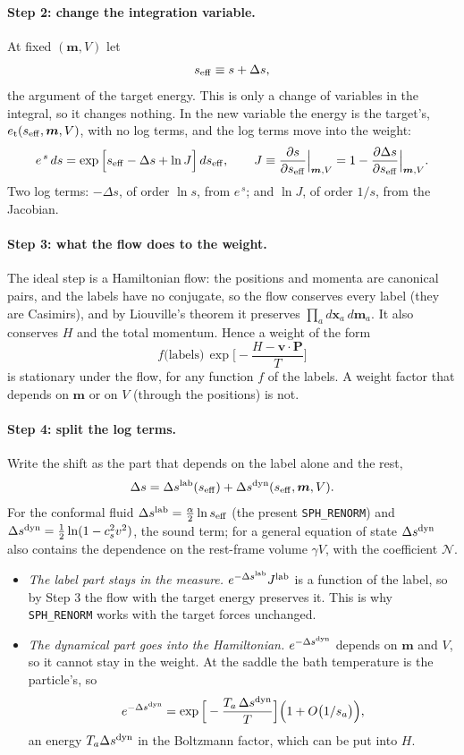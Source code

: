 \documentclass[11pt,aps,preprint,nofootinbib,superscriptaddress,tightenlines]{revtex4-2}
\def\st{\begin{equation}}
\def\stp{\end{equation}}
\let\oldparagraph\paragraph
\renewcommand{\paragraph}{\par\bigskip\oldparagraph}
\begin{document}
\paragraph{Step 2: change the integration variable.}  At fixed $(\bm m,V)$ let
\st
s_{\rm eff}\equiv s+\Delta s ,
\stp
the argument of the target energy.  This is only a change of variables in the integral, so it changes nothing.  In the new variable the energy is the target's,
$e_{\rm t}(s_{\rm eff},\bm m,V)$, with no log terms, and the log terms move into the weight:
\st
e^{\,s}\,ds=\exp\Big[s_{\rm eff}-\Delta s+\ln J\Big]\,ds_{\rm eff},\qquad J\equiv\frac{\partial s}{\partial s_{\rm eff}}\Big|_{\bm m,V}=1-\frac{\partial\Delta s}{\partial s_{\rm eff}}\Big|_{\bm m,V} .
\stp
Two log terms: $-\Delta s$, of order $\ln s$, from $e^{\,s}$; and $\ln J$, of order $1/s$, from the Jacobian.

\paragraph{Step 3: what the flow does to the weight.}  The ideal step is a Hamiltonian flow: the positions and momenta are canonical pairs, and the labels have no conjugate,
so the flow conserves every label (they are Casimirs), and by Liouville's theorem it preserves $\prod_a d\bm x_a\,d\bm m_a$.  It also conserves $H$ and the total momentum.
Hence a weight of the form
\st
f\big(\text{labels}\big)\,\exp\Big[-\frac{H-\bm v\cdot\bm P}T\Big]
\stp
is stationary under the flow, for any function $f$ of the labels.  A weight factor that depends on $\bm m$ or on $V$ (through the positions) is not.

\paragraph{Step 4: split the log terms.}  Write the shift as the part that depends on the label alone and the rest,
\st
\Delta s=\Delta s^{\rm lab}(s_{\rm eff})+\Delta s^{\rm dyn}(s_{\rm eff},\bm m,V) .
\stp
For the conformal fluid $\Delta s^{\rm lab}=\tfrac\alpha2\ln s_{\rm eff}$ (the present \texttt{SPH\_RENORM}) and $\Delta s^{\rm dyn}=\tfrac12\ln(1-c_s^2v^2)$, the sound term; for a general
equation of state $\Delta s^{\rm dyn}$ also contains the dependence on the rest-frame volume $\gamma V$, with the coefficient $\mathcal N$.
\begin{itemize}
\item \emph{The label part stays in the measure.}  $e^{-\Delta s^{\rm lab}}J^{\rm lab}$ is a function of the label, so by Step 3 the flow with the target energy preserves it.  This
  is why \texttt{SPH\_RENORM} works with the target forces unchanged.
\item \emph{The dynamical part goes into the Hamiltonian.}  $e^{-\Delta s^{\rm dyn}}$ depends on $\bm m$ and $V$, so it cannot stay in the weight.  At the saddle the bath
  temperature is the particle's, so
  \st
  e^{-\Delta s^{\rm dyn}}=\exp\Big[-\frac{T_a\,\Delta s^{\rm dyn}}T\Big]\Big(1+O\big(1/s_a\big)\Big) ,
  \stp
  an energy $T_a\Delta s^{\rm dyn}$ in the Boltzmann factor, which can be put into $H$.
\end{itemize}
\end{document}
